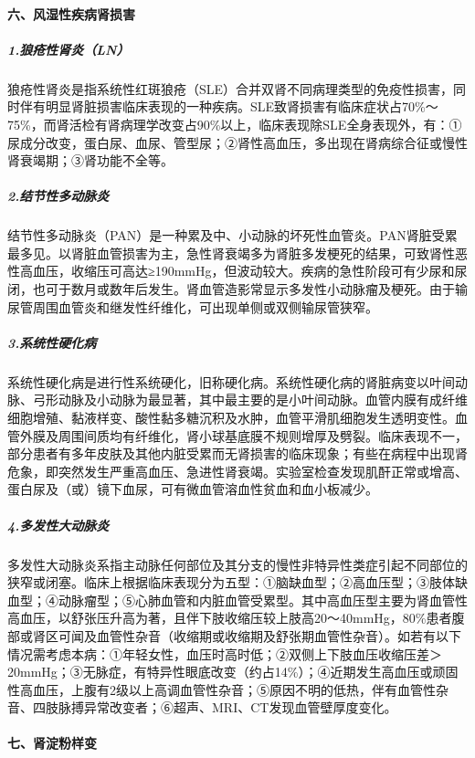\paragraph{六、风湿性疾病肾损害}

\subparagraph{1.狼疮性肾炎（LN）}

狼疮性肾炎是指系统性红斑狼疮（SLE）合并双肾不同病理类型的免疫性损害，同时伴有明显肾脏损害临床表现的一种疾病。SLE致肾损害有临床症状占70\%～75\%，而肾活检有肾病理学改变占90\%以上，临床表现除SLE全身表现外，有：①尿成分改变，蛋白尿、血尿、管型尿；②肾性高血压，多出现在肾病综合征或慢性肾衰竭期；③肾功能不全等。

\subparagraph{2.结节性多动脉炎}

结节性多动脉炎（PAN）是一种累及中、小动脉的坏死性血管炎。PAN肾脏受累最多见。以肾脏血管损害为主，急性肾衰竭多为肾脏多发梗死的结果，可致肾性恶性高血压，收缩压可高达≥190mmHg，但波动较大。疾病的急性阶段可有少尿和尿闭，也可于数月或数年后发生。肾血管造影常显示多发性小动脉瘤及梗死。由于输尿管周围血管炎和继发性纤维化，可出现单侧或双侧输尿管狭窄。

\subparagraph{3.系统性硬化病}

系统性硬化病是进行性系统硬化，旧称硬化病。系统性硬化病的肾脏病变以叶间动脉、弓形动脉及小动脉为最显著，其中最主要的是小叶间动脉。血管内膜有成纤维细胞增殖、黏液样变、酸性黏多糖沉积及水肿，血管平滑肌细胞发生透明变性。血管外膜及周围间质均有纤维化，肾小球基底膜不规则增厚及劈裂。临床表现不一，部分患者有多年皮肤及其他内脏受累而无肾损害的临床现象；有些在病程中出现肾危象，即突然发生严重高血压、急进性肾衰竭。实验室检查发现肌酐正常或增高、蛋白尿及（或）镜下血尿，可有微血管溶血性贫血和血小板减少。

\subparagraph{4.多发性大动脉炎}

多发性大动脉炎系指主动脉任何部位及其分支的慢性非特异性类症引起不同部位的狭窄或闭塞。临床上根据临床表现分为五型：①脑缺血型；②高血压型；③肢体缺血型；④动脉瘤型；⑤心肺血管和内脏血管受累型。其中高血压型主要为肾血管性高血压，以舒张压升高为著，且伴下肢收缩压较上肢高20～40mmHg，80\%患者腹部或肾区可闻及血管性杂音（收缩期或收缩期及舒张期血管性杂音）。如若有以下情况需考虑本病：①年轻女性，血压时高时低；②双侧上下肢血压收缩压差＞20mmHg；③无脉症，有特异性眼底改变（约占14\%）；④近期发生高血压或顽固性高血压，上腹有2级以上高调血管性杂音；⑤原因不明的低热，伴有血管性杂音、四肢脉搏异常改变者；⑥超声、MRI、CT发现血管壁厚度变化。

\paragraph{七、肾淀粉样变}

